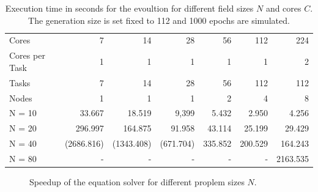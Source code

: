 \documentclass[12pt]{article}
\begin{document}
\begin{table}[p]
    \centering
    \begin{tabular}{lrrrrrr}
        \toprule
        Cores & 7 & 14 & 28 & 56 & 112 & 224 \\
        Cores per Task & 1 & 1 & 1 & 1 & 1 & 2 \\
        Tasks & 7 & 14 & 28 & 56 & 112 & 112 \\
        Nodes & 1 & 1 & 1 & 2 & 4 & 8 \\
        \midrule
        N = 10 & 33.667     & 18.519 & 9,399 & 5.432 & 2.950 & 4.256 \\
        N = 20 & 296.997    & 164.875 & 91.958 & 43.114 & 25.199 & 29.429 \\
        N = 40 & (2686.816) & (1343.408) & (671.704) & 335.852 & 200.529 & 164.243 \\
        N = 80 & - & - & - & - & - & 2163.535 \\
        \bottomrule
    \end{tabular}
    \caption{Execution time in seconds for the evoultion for different field sizes $N$ and cores $C$. The generation size is set fixed to 112 and 1000 epochs are simulated.}
    \label{tab:SpeedupEvolution}
\end{table}

\begin{figure}[p]
    \centering
    
    \caption{Speedup of the equation solver for different proplem sizes $N$.}
    \label{fig:SpeedupEvolution}
\end{figure}


\clearpage
\end{document}
